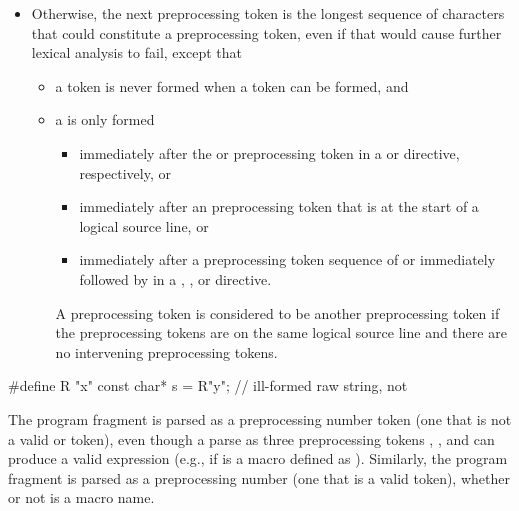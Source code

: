 \begin{itemize}
\item Otherwise,
the next preprocessing token is the longest sequence of
characters that could constitute a preprocessing token, even if that
would cause further lexical analysis to fail,
except that
\begin{itemize}
\item
a  token is never formed
when a  token can be formed, and
\item
a  is only formed
\begin{itemize}
\item
immediately after the  or  preprocessing token in a
 or 
directive, respectively, or
\item
immediately after an  preprocessing token that
is at the start of a logical source line, or
\item
immediately after a preprocessing token sequence of 
or  immediately followed by \tcode{(}
in a , , or  directive.
\end{itemize}
A preprocessing token is considered to be
another preprocessing token if
the preprocessing tokens are on the same logical source line and
there are no intervening preprocessing tokens.
\end{itemize}
\end{itemize}

\pnum
\begin{example}
\begin{codeblock}
#define R "x"
const char* s = R"y";           // ill-formed raw string, not 
\end{codeblock}
\end{example}

\pnum
\begin{example}
The program fragment  is parsed as a
preprocessing number token (one that is not a valid
 or  token),
even though a parse as three preprocessing tokens
, \tcode{+}, and  can produce a valid expression
(e.g., if  is a macro defined as ). Similarly, the
program fragment  is parsed as a preprocessing number (one
that is a valid  token),
whether or not  is a macro name.
\end{example}

